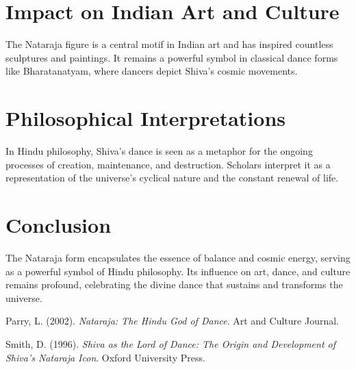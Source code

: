 \documentclass[a4paper,12pt]{article}
\begin{document}
\section{Impact on Indian Art and Culture}
The Nataraja figure is a central motif in Indian art and has inspired countless sculptures and paintings. It remains a powerful symbol in classical dance forms like Bharatanatyam, where dancers depict Shiva’s cosmic movements.

\section{Philosophical Interpretations}
In Hindu philosophy, Shiva’s dance is seen as a metaphor for the ongoing processes of creation, maintenance, and destruction. Scholars interpret it as a representation of the universe’s cyclical nature and the constant renewal of life.

\section{Conclusion}
The Nataraja form encapsulates the essence of balance and cosmic energy, serving as a powerful symbol of Hindu philosophy. Its influence on art, dance, and culture remains profound, celebrating the divine dance that sustains and transforms the universe.

\begin{thebibliography}{9}
Parry, L. (2002). \textit{Nataraja: The Hindu God of Dance}. Art and Culture Journal.

Smith, D. (1996). \textit{Shiva as the Lord of Dance: The Origin and Development of Shiva’s Nataraja Icon}. Oxford University Press.

\end{thebibliography}
\end{document}
